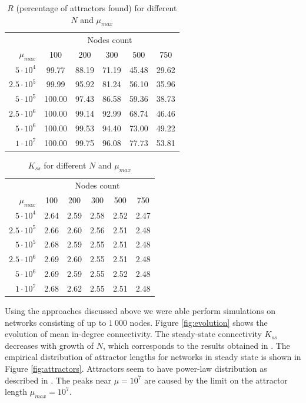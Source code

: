 \documentclass[procedia]{easychair}
\begin{document}
	\begin{table}[ht!]
		\centering
		\begin{tabular}{r | c c c c c}
			& \multicolumn{5}{c}{Nodes count} \\
			$\mu_{max}$	& 100	& 	200	&	300	&	500	&	750\\ \hline
			$5 \cdot 10^4$	&	99.77	&	88.19	&	71.19	&	45.48	&	29.62\\
			$2.5 \cdot 10^5$	&	99.99	&	95.92	&	81.24	&	56.10	&	35.96\\
			$5 \cdot 10^5$	&	100.00	&	97.43	&	86.58	&	59.36	&	38.73\\
			$2.5 \cdot 10^6$	&	100.00	&	99.14	&	92.99	&	68.74	&	46.46\\
			$5 \cdot 10^6$	&	100.00	&	99.53	&	94.40	&	73.00	&	49.22\\
			$1 \cdot 10^7$	&	100.00	&	99.75	&	96.08	&	77.73	&	53.81\\
		\end{tabular}
		\caption{$R$ (percentage of attractors found) for different $N$ and $\mu_{max}$}
		\label{table:percentage_of_attractors}
	\end{table}
	\begin{table}[ht!]
		\centering
		\begin{tabular}{r | c c c c c}
			& \multicolumn{5}{c}{Nodes count} \\
			$\mu_{max}$	& 100	& 	200	&	300	&	500	& 750\\
			\hline
			$5 \cdot 10^4$	&	2.64	&	2.59	&	2.58	&	2.52	&	2.47\\
			$2.5 \cdot 10^5$	&	2.66	&	2.60	&	2.56	&	2.51	&	2.48\\
			$5 \cdot 10^5$	&	2.68	&	2.59	&	2.55	&	2.51	&	2.48\\
			$2.5 \cdot 10^6$	&	2.69	&	2.60	&	2.55	&	2.51	&	2.48\\
			$5 \cdot 10^6$	&	2.69	&	2.59	&	2.55	&	2.52	&	2.48\\
			$1 \cdot 10^7$	&	2.68	&	2.62	&	2.55	&	2.51	&	2.48\\
		\end{tabular}
		\caption{$K_{ss}$ for different $N$ and $\mu_{max}$}
		\label{table:kss}
	\end{table}
	
	Using the approaches discussed above we were able perform simulations on networks consisting of up to $1~000$ nodes. Figure \ref{fig:evolution} shows the evolution of mean in-degree connectivity. The steady-state connectivity $K_{ss}$ decreases with growth of $N$, which corresponds to the results obtained in \cite{mlb}. The empirical distribution of attractor lengths for networks in steady state is shown in Figure \ref{fig:attractors}. Attractors seem to have power-law distribution as described in \cite{mlb}. The peaks near $\mu=10^7$  are caused by the limit on the attractor length $\mu_{max} = 10^7$.
	
\end{document}

